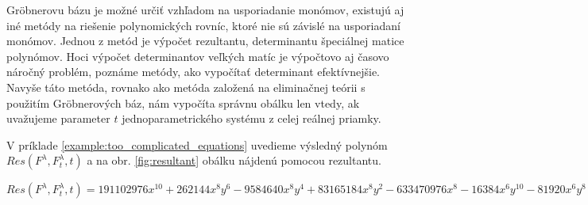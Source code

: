 Gröbnerovu bázu je možné určiť vzhľadom na usporiadanie monómov, existujú aj iné metódy na riešenie polynomických rovníc, ktoré nie sú závislé na usporiadaní monómov. Jednou z metód je výpočet rezultantu, determinantu špeciálnej matice polynómov.
Hoci výpočet determinantov veľkých matíc je výpočtovo aj časovo náročný problém, poznáme metódy, ako vypočítať determinant efektívnejšie. Navyše táto metóda, rovnako ako metóda založená na eliminačnej teórii s použitím Gröbnerových báz, nám vypočíta správnu obálku len vtedy, ak uvažujeme parameter $t$ jednoparametrického systému z celej reálnej priamky. 



V príklade \ref{example:too_complicated_equations} uvedieme výsledný polynóm $Res(F^\lambda , F_t^\lambda , t)$ a na obr. \ref{fig:resultant} obálku nájdenú pomocou rezultantu. 

$ Res(F^\lambda , F_t^\lambda , t) = 191102976x^{10} + 262144x^8y^6 - 9584640x^8y^4 + 83165184x^8y^2 - 633470976x^8 - 16384x^6y^{10} - 81920x^6y^8 - 14483456x^6y^6 - 113311744x^6y^4 + 96419840x^6y^2 + 698368000x^6 - 16384x^4y^{12} - 294912x^4y^{10} - 2998272x^4y^8 - 18284544x^4y^6 - 74956800x^4y^4 - 184320000x^4y^2 - 256000000x^4. $


